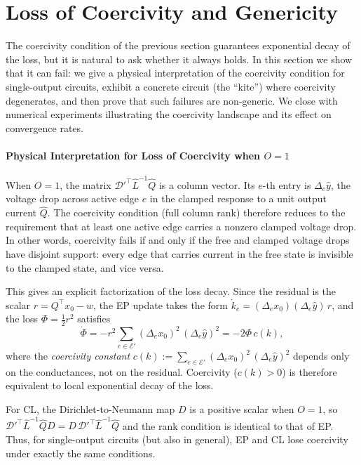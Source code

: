 \documentclass{siamart}
\begin{document}
\section{Loss of Coercivity and Genericity}
\label{sec:kite}

The coercivity condition of the previous section guarantees exponential decay of the loss, but it is natural to ask whether it always holds. In this section we show that it can fail: we give a physical interpretation of the coercivity condition for single-output circuits, exhibit a concrete circuit (the ``kite'') where coercivity degenerates, and then prove that such failures are non-generic. We close with numerical experiments illustrating the coercivity landscape and its effect on convergence rates.

\paragraph{Physical Interpretation for Loss of Coercivity when $O=1$}
When $O=1$, the matrix $\mathscr{D}'^\top \hat{L}^{-1}\hat{Q}$ is a column vector. Its $e$-th entry is $\Delta_e \hat{y}$, the voltage drop across active edge $e$ in the clamped response to a unit output current $\hat{Q}$. The coercivity condition (full column rank) therefore reduces to the requirement that at least one active edge carries a nonzero clamped voltage drop. In other words, coercivity fails if and only if the free and clamped voltage drops have disjoint support: every edge that carries current in the free state is invisible to the clamped state, and vice versa.

This gives an explicit factorization of the loss decay. Since the residual is the scalar $r = Q^\top x_0 - w$, the EP update takes the form $\dot{k}_e = (\Delta_e x_0)(\Delta_e \hat{y})\, r$, and the loss $\Phi = \frac{1}{2}r^2$ satisfies
\[
\dot{\Phi} = -r^2 \sum_{e \in \mathcal{E}'} (\Delta_e x_0)^2\, (\Delta_e \hat{y})^2 = -2\Phi\, c(k),
\]
where the \emph{coercivity constant} $c(k) := \sum_{e \in \mathcal{E}'} (\Delta_e x_0)^2\, (\Delta_e \hat{y})^2$ depends only on the conductances, not on the residual. Coercivity ($c(k) > 0$) is therefore equivalent to local exponential decay of the loss.

For CL, the Dirichlet-to-Neumann map $D$ is a positive scalar when $O=1$, so $\mathscr{D}'^\top \hat{L}^{-1}\hat{Q}D = D\,\mathscr{D}'^\top \hat{L}^{-1}\hat{Q}$ and the rank condition is identical to that of EP. Thus, for single-output circuits (but also in general), EP and CL lose coercivity under exactly the same conditions.
\end{document}
